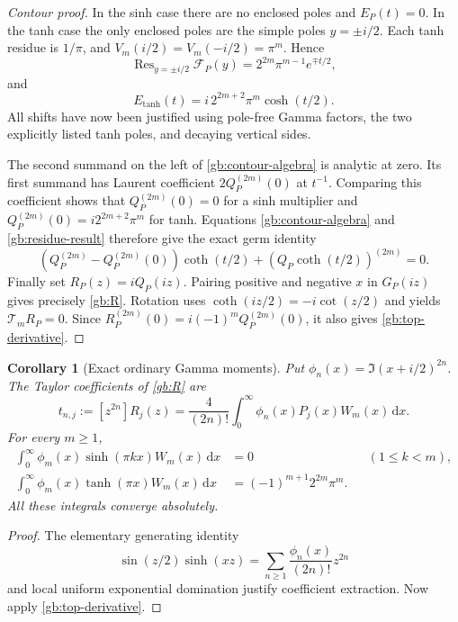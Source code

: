 \documentclass[11pt,a4paper]{article}
\numberwithin{equation}{section}
\newtheorem{corollary}[theorem]{Corollary}
\theoremstyle{definition}
\theoremstyle{remark}
\DeclareMathOperator{\Res}{Res}
\newcommand{\dd}{\,\mathrm d}
\begin{document}
\begin{proof}[Contour proof]
In the sinh case there are no enclosed poles and $E_P(t)=0$.
In the tanh case the only enclosed poles are the simple poles
$y=\pm i/2$.  Each tanh residue is $1/\pi$, and
$V_m(i/2)=V_m(-i/2)=\pi^m$.  Hence
\[
 \Res_{y=\pm i/2}\mathcal F_P(y)
      =2^{2m}\pi^{m-1}e^{\mp t/2},
\]
and
\begin{equation}\label{gb:residue-result}
 E_{\tanh}(t)=i\,2^{2m+2}\pi^m\cosh(t/2).
\end{equation}
All shifts have now been justified using pole-free Gamma factors,
the two explicitly listed tanh poles, and decaying vertical sides.

The second summand on the left of \eqref{gb:contour-algebra} is
analytic at zero.  Its first summand has Laurent coefficient
$2Q_P^{(2m)}(0)$ at $t^{-1}$.  Comparing this coefficient shows
that $Q_P^{(2m)}(0)=0$ for a sinh multiplier and
$Q_P^{(2m)}(0)=i2^{2m+2}\pi^m$ for tanh.  Equations
\eqref{gb:contour-algebra} and \eqref{gb:residue-result} therefore
give the exact germ identity
\[
 (Q_P^{(2m)}-Q_P^{(2m)}(0))\coth(t/2)
                  +(Q_P\coth(t/2))^{(2m)}=0.
\]
Finally set $R_P(z)=iQ_P(iz)$.  Pairing positive and negative
$x$ in $G_P(iz)$ gives precisely \eqref{gb:R}.  Rotation uses
$\coth(iz/2)=-i\cot(z/2)$ and yields
$\mathcal T_mR_P=0$.  Since
$R_P^{(2m)}(0)=i(-1)^mQ_P^{(2m)}(0)$, it also gives
\eqref{gb:top-derivative}.
\end{proof}

\begin{corollary}[Exact ordinary Gamma moments]\label{gb:moment-identities}
Put $\phi_n(x)=\Im(x+i/2)^{2n}$.  The Taylor coefficients of
\eqref{gb:R} are
\begin{equation}\label{gb:t}
 t_{n,j}:=[z^{2n}]R_j(z)
      =\frac4{(2n)!}\int_0^\infty\phi_n(x)P_j(x)W_m(x)\dd x.
\end{equation}
For every $m\ge1$,
\begin{align}
 \int_0^\infty\phi_m(x)\sinh(\pi kx)W_m(x)\dd x&=0
                  &&(1\le k<m),\label{gb:orthogonality}\\
 \int_0^\infty\phi_m(x)\tanh(\pi x)W_m(x)\dd x
          &=(-1)^{m+1}2^{2m}\pi^m.\label{gb:evaluation}
\end{align}
All these integrals converge absolutely.
\end{corollary}

\begin{proof}
The elementary generating identity
\[
 \sin(z/2)\sinh(xz)=
       \sum_{n\ge1}\frac{\phi_n(x)}{(2n)!}z^{2n}
\]
and local uniform exponential domination justify coefficient
extraction.  Now apply \eqref{gb:top-derivative}.
\end{proof}
\end{document}
